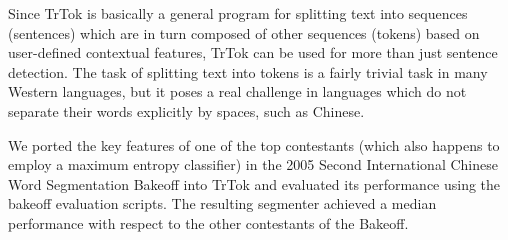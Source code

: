 Since TrTok is basically a general program for splitting text into
sequences (sentences) which are in turn composed of other sequences
(tokens) based on user-defined contextual features, TrTok can be used
for more than just sentence detection. The task of splitting text into
tokens is a fairly trivial task in many Western languages, but it
poses a real challenge in languages which do not separate their words
explicitly by spaces, such as Chinese.

We ported the key features of one of the top contestants (which also
happens to employ a maximum entropy classifier)
\cite{seg-chinese-maxent} in the 2005 Second International Chinese
Word Segmentation Bakeoff into TrTok and evaluated its performance
using the bakeoff evaluation scripts. The resulting segmenter achieved
a median performance with respect to the other contestants of the
Bakeoff.
